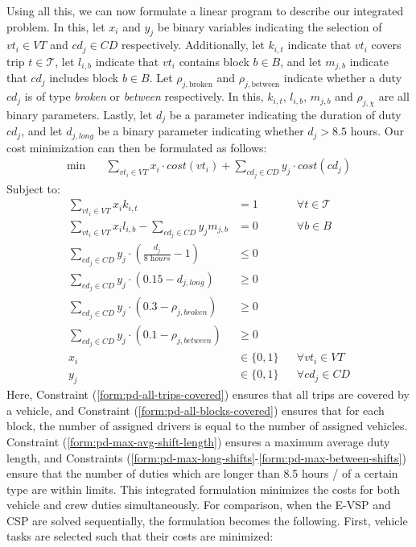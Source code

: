 \documentclass[]{article}
\begin{document}
\noindent {} Using all this, we can now formulate a linear program to describe our integrated problem. In this, let $x_i$ and $y_j$ be binary variables indicating the selection of $vt_i \in VT$ and $cd_j \in CD$ respectively. Additionally, let $k_{i,t}$ indicate that $vt_i$ covers trip $t \in \mathcal{T}$, let $l_{i,b}$ indicate that $vt_i$ contains block $b \in B$, and let $m_{j,b} $ indicate that $cd_j$ includes block $b \in B$. Let $\rho_{j,\text{broken}}$ and $\rho_{j,\text{between}}$ indicate whether a duty $cd_j$ is of type \textit{broken} or \textit{between} respectively. In this, $k_{i,t}$, $l_{i,b}$, $m_{j,b}$ and $\rho_{j,\chi}$  are all binary parameters. Lastly, let $d_j$ be a parameter indicating the duration of duty $cd_j$, and let $d_{j,\textit{long}}$ be a binary parameter indicating whether $d_j > 8.5$ hours. Our cost minimization can then be formulated as follows:
\begin{align}
\min \quad
& \sum_{vt_i \in VT} x_{i} \cdot cost(vt_i) + \sum_{cd_j \in CD} y_{j} \cdot cost(cd_j)  
\end{align}
Subject to:
\begin{align}
\sum_{vt_i \in VT} x_{i}k_{i,t} &= 1 && \forall t \in \mathcal{T} \label{form:pd-all-trips-covered} \\
\sum_{vt_i \in VT}x_i l_{i,b} - \sum_{cd_j \in CD}y_j m_{j,b} &= 0 && \forall b \in B \label{form:pd-all-blocks-covered} \\
\sum_{cd_j \in \textit{CD}} y_{j} \cdot (\frac{d_{j}}{\textit{8 hours}} - 1) &\leq 0 && \label{form:pd-max-avg-shift-length}\\
\sum_{cd_j \in \textit{CD}} y_{j} \cdot (0.15 - d_{j,\textit{long}}) &\geq 0 && \label{form:pd-max-long-shifts}\\
\sum_{cd_j \in \textit{CD}} y_{j} \cdot (0.3 - \rho_{j,\textit{broken}}) &\geq 0 && \label{form:pd-max-broken-shifts}\\
\sum_{cd_j \in \textit{CD}} y_{j} \cdot (0.1 - \rho_{j,\textit{between}}) &\geq 0 && \label{form:pd-max-between-shifts}\\
x_{i} &\in \{ 0, 1 \} && \forall vt_i \in VT \\
y_{j} &\in \{ 0, 1 \} && \forall cd_j \in CD
\end{align}
Here, Constraint (\ref{form:pd-all-trips-covered}) ensures that all trips are covered by a vehicle, and Constraint (\ref{form:pd-all-blocks-covered}) ensures that for each block, the number of assigned drivers is equal to the number of assigned vehicles. Constraint (\ref{form:pd-max-avg-shift-length}) ensures a maximum average duty length, and Constraints (\ref{form:pd-max-long-shifts}-\ref{form:pd-max-between-shifts}) ensure that the number of duties which are longer than 8.5 hours / of a certain type are within limits. This integrated formulation minimizes the costs for both vehicle and crew duties simultaneously. For comparison, when the E-VSP and CSP are solved sequentially, the formulation becomes the following. First, vehicle tasks are selected such that their costs are minimized:
\end{document}
